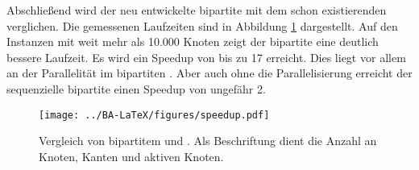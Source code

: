 Abschließend wird der neu entwickelte bipartite \gc{} mit dem schon existierenden \cb{}  verglichen.
Die gemessenen Laufzeiten sind in Abbildung \ref{fig:speedup_komplett} dargestellt. Auf den Instanzen mit 
weit mehr als 10.000 Knoten zeigt der bipartite \gc{} eine deutlich bessere Laufzeit. Es wird ein Speedup von 
bis zu 17 erreicht. Dies liegt vor allem an der Parallelität im bipartiten \gc{}. Aber auch ohne
die Parallelisierung erreicht der sequenzielle bipartite \gc{} einen Speedup von ungefähr 2.



\begin{figure}[H]
\centering
	\texttt{[image: ../BA-LaTeX/figures/speedup.pdf]}
	\caption[Laufzeitvergleich von bipartitem \gc{} und einer abgeänderten Variante von \cb{}]
	{Vergleich von bipartitem \gc{} und \cb{}.
	Als Beschriftung dient die Anzahl an Knoten, Kanten und aktiven Knoten.}
	\label{fig:speedup_komplett}
\end{figure} 
   
